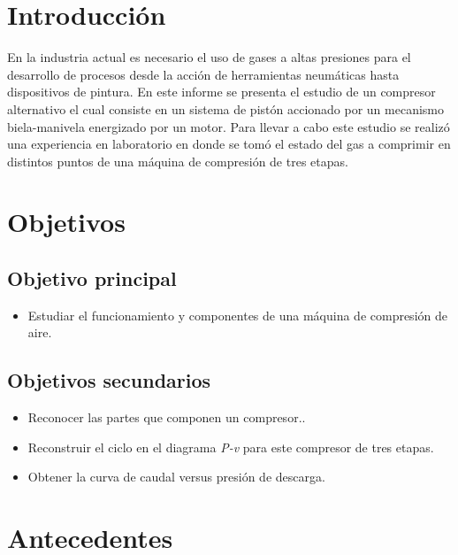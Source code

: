 \documentclass[11pt,letterpaper]{extarticle}        %
\numberwithin{equation}{section}                    %
\begin{document}
\pagestyle{fancy}
\thispagestyle{NoPortadaNoEnumerada}

\newpage
\tableofcontents        %
\newpage
\listoffigures          %
\listoftables           %


\newpage
\setcounter{page}{1}
\pagestyle{NoPortada}

\section{Introducción}
En la industria actual es necesario el uso de gases a altas presiones para el desarrollo de procesos desde la acción de herramientas neumáticas hasta dispositivos de pintura. En este informe se presenta el estudio de un compresor alternativo el cual consiste en un sistema de pistón accionado por un mecanismo biela-manivela energizado por un motor. Para llevar a cabo este estudio se realizó una experiencia en laboratorio en donde se tomó el estado del gas a comprimir en distintos puntos de una máquina de compresión de tres etapas.

\section{Objetivos}
\subsection*{Objetivo principal}
\begin{itemize}
\item Estudiar el funcionamiento  y componentes de una máquina de compresión de aire.
\end{itemize}
\subsection*{Objetivos secundarios}
\begin{itemize}
\item Reconocer las partes que componen un compresor..
\item Reconstruir el ciclo en el diagrama \textit{P-v} para este compresor de tres etapas.
\item Obtener la curva de caudal versus presión de descarga.
\end{itemize}

\section{Antecedentes}
\end{document}
